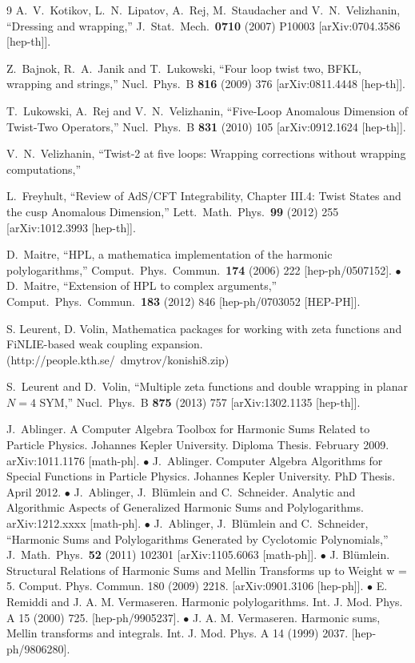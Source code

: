 \documentclass[a4paper,11pt]{article}
\numberwithin{equation}{section}
\begin{document}
\begin{thebibliography} {9}
  A.~V.~Kotikov, L.~N.~Lipatov, A.~Rej, M.~Staudacher and V.~N.~Velizhanin,
  ``Dressing and wrapping,''
  J.\ Stat.\ Mech.\  {\bf 0710} (2007) P10003
  [arXiv:0704.3586 [hep-th]].

  Z.~Bajnok, R.~A.~Janik and T.~Lukowski,
  ``Four loop twist two, BFKL, wrapping and strings,''
  Nucl.\ Phys.\ B {\bf 816} (2009) 376
  [arXiv:0811.4448 [hep-th]].

  T.~Lukowski, A.~Rej and V.~N.~Velizhanin,
  ``Five-Loop Anomalous Dimension of Twist-Two Operators,''
  Nucl.\ Phys.\ B {\bf 831} (2010) 105
  [arXiv:0912.1624 [hep-th]].

  V.~N.~Velizhanin,
  ``Twist-2 at five loops: Wrapping corrections without wrapping computations,''

  L.~Freyhult,
  ``Review of AdS/CFT Integrability, Chapter III.4: Twist States and the cusp Anomalous Dimension,''
  Lett.\ Math.\ Phys.\  {\bf 99} (2012) 255
  [arXiv:1012.3993 [hep-th]].

D.~Maitre,
  ``HPL, a mathematica implementation of the harmonic polylogarithms,''
  Comput.\ Phys.\ Commun.\  {\bf 174} (2006) 222
  [hep-ph/0507152]. $\bullet$
  D.~Maitre,
  ``Extension of HPL to complex arguments,''
  Comput.\ Phys.\ Commun.\  {\bf 183} (2012) 846
  [hep-ph/0703052 [HEP-PH]].

S. Leurent, D. Volin, Mathematica packages for working with zeta
functions and FiNLIE-based weak coupling expansion.
(http://people.kth.se/~dmytrov/konishi8.zip)

  S.~Leurent and D.~Volin,
  ``Multiple zeta functions and double wrapping in planar $N=4$ SYM,''
  Nucl.\ Phys.\ B {\bf 875} (2013) 757
  [arXiv:1302.1135 [hep-th]].

  J.~Ablinger.
  A Computer Algebra Toolbox for Harmonic Sums Related to Particle Physics. Johannes Kepler University. Diploma Thesis. February 2009.
  arXiv:1011.1176 [math-ph].   $\bullet$
J.~Ablinger. Computer Algebra Algorithms for Special Functions in Particle Physics. Johannes Kepler University. PhD Thesis. April 2012. $\bullet$
J.~Ablinger, J.~Bl\"umlein and C.~Schneider. Analytic and Algorithmic Aspects of Generalized Harmonic Sums and Polylogarithms. arXiv:1212.xxxx [math-ph].
$\bullet$
  J.~Ablinger, J.~Bl\"umlein and C.~Schneider,
  ``Harmonic Sums and Polylogarithms Generated by Cyclotomic Polynomials,''
  J.\ Math.\ Phys.\  {\bf 52} (2011) 102301
[arXiv:1105.6063 [math-ph]].
$\bullet$
J. Bl\"umlein. Structural Relations of Harmonic Sums and Mellin Transforms up to Weight w = 5. Comput. Phys. Commun. 180 (2009) 2218. [arXiv:0901.3106 [hep-ph]].
$\bullet$
E. Remiddi and J. A. M. Vermaseren. Harmonic polylogarithms. Int. J. Mod. Phys. A 15 (2000) 725. [hep-ph/9905237].
$\bullet$
J. A. M. Vermaseren. Harmonic sums, Mellin transforms and integrals. Int. J. Mod. Phys. A 14 (1999) 2037. [hep-ph/9806280].


\end{thebibliography}
\end{document}

